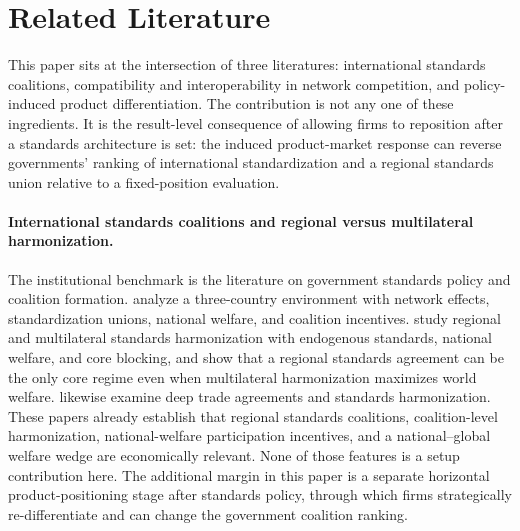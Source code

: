 \section{Related Literature}\label{sec:literature}

This paper sits at the intersection of three literatures: international standards coalitions, compatibility and interoperability in network competition, and policy-induced product differentiation. The contribution is not any one of these ingredients. It is the result-level consequence of allowing firms to reposition after a standards architecture is set: the induced product-market response can reverse governments' ranking of international standardization and a regional standards union relative to a fixed-position evaluation.

\paragraph{International standards coalitions and regional versus multilateral harmonization.}
The institutional benchmark is the literature on government standards policy and coalition formation. \citet{GandalShy2001} analyze a three-country environment with network effects, standardization unions, national welfare, and coalition incentives. \citet{TakaradaEtAl2020} study regional and multilateral standards harmonization with endogenous standards, national welfare, and core blocking, and show that a regional standards agreement can be the only core regime even when multilateral harmonization maximizes world welfare. \citet{KawabataTakarada2021} likewise examine deep trade agreements and standards harmonization. These papers already establish that regional standards coalitions, coalition-level harmonization, national-welfare participation incentives, and a national--global welfare wedge are economically relevant. None of those features is a setup contribution here. The additional margin in this paper is a separate horizontal product-positioning stage after standards policy, through which firms strategically re-differentiate and can change the government coalition ranking.

